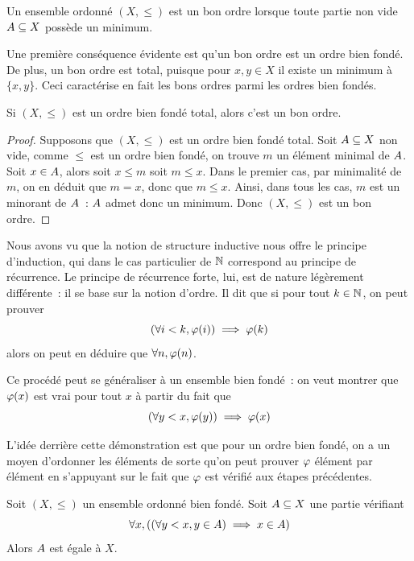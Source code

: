 \begin{definition}
  Un ensemble ordonné $(X,\leq)$ est un bon ordre lorsque toute partie non vide
  $A\subseteq X$ possède un minimum.
\end{definition}

Une première conséquence évidente est qu'un bon ordre est un ordre bien fondé.
De plus, un bon ordre est total, puisque pour $x,y\in X$ il existe un minimum
à $\{x,y\}$. Ceci caractérise en fait les bons ordres parmi les ordres bien
fondés.

\begin{proposition}
  Si $(X,\leq)$ est un ordre bien fondé total, alors c'est un bon ordre.
\end{proposition}

\begin{proof}
  Supposons que $(X,\leq)$ est un ordre bien fondé total. Soit
  $A\subseteq X$ non vide, comme $\leq$ est un ordre bien fondé, on trouve
  $m$ un élément minimal de $A$. Soit $x\in A$, alors soit $x \leq m$
  soit $m\leq x$. Dans le premier cas, par minimalité de $m$, on en déduit que
  $m = x$, donc que $m\leq x$. Ainsi, dans tous les cas, $m$ est un minorant de
  $A$~: $A$ admet donc un minimum.
  Donc $(X,\leq)$ est un bon ordre.
\end{proof}

Nous avons vu que la notion de structure inductive nous offre le principe
d'induction, qui dans le cas particulier de $\mathbb N$ correspond au principe
de récurrence. Le principe de récurrence forte, lui, est de nature légèrement
différente~: il se base sur la notion d'ordre. Il dit que si pour tout
$k\in\mathbb N$, on peut prouver
\[(\forall i < k, \varphi(i)) \implies \varphi(k)\]
alors on peut en déduire que $\forall n, \varphi(n)$.

Ce procédé peut se généraliser à un ensemble bien fondé~: on veut montrer que
$\varphi(x)$ est vrai pour tout $x$ à partir du fait que
\[(\forall y < x, \varphi(y)) \implies \varphi(x)\]

L'idée derrière cette démonstration est que pour un ordre bien fondé, on a un
moyen d'ordonner les éléments de sorte qu'on peut prouver $\varphi$ élément par
élément en s'appuyant sur le fait que $\varphi$ est vérifié aux étapes
précédentes.

\begin{theorem}
  Soit $(X,\leq)$ un ensemble ordonné bien fondé. Soit $A\subseteq X$ une
  partie vérifiant
  \[\forall x, ((\forall y < x, y\in A) \implies x\in A)\]
  Alors $A$ est égale à $X$.
\end{theorem}

